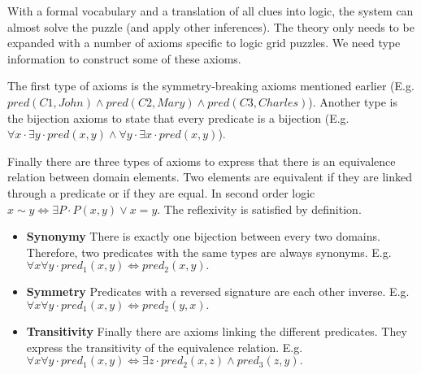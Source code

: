 With a formal vocabulary and a translation of all clues into logic, the system can almost solve the puzzle (and apply other inferences). The theory only needs to be expanded with a number of axioms specific to logic grid puzzles. We need type information to construct some of these axioms. 

The first type of axioms is the symmetry-breaking axioms mentioned earlier (E.g. $pred(C1, John) \land pred(C2, Mary) \land pred(C3, Charles)$). Another type is the bijection axioms to state that every predicate is a bijection (E.g. $\forall x \cdot \exists y \cdot pred(x, y) \land \forall y \cdot \exists x \cdot pred(x, y)$).

Finally there are three types of axioms to express that there is an equivalence relation between domain elements. Two elements are equivalent if they are linked through a predicate or if they are equal. In second order logic $x \sim y \Leftrightarrow \exists P \cdot P(x, y) \lor x = y$. The reflexivity is satisfied by definition.

\begin{itemize}
  \item \textbf{Synonymy} There is exactly one bijection between every two domains. Therefore, two predicates with the same types are always synonyms. E.g. $\forall x \forall y \cdot pred_1(x, y) \Leftrightarrow pred_2(x, y).$
  \item \textbf{Symmetry} Predicates with a reversed signature are each other inverse. E.g. $\forall x \forall y \cdot pred_1(x, y) \Leftrightarrow pred_2(y, x).$
  \item \textbf{Transitivity} Finally there are axioms linking the different predicates. They express the transitivity of the equivalence relation. E.g. $\forall x \forall y \cdot pred_1(x, y) \Leftrightarrow \exists z \cdot pred_2(x, z) \land pred_3(z, y).$
\end{itemize}

